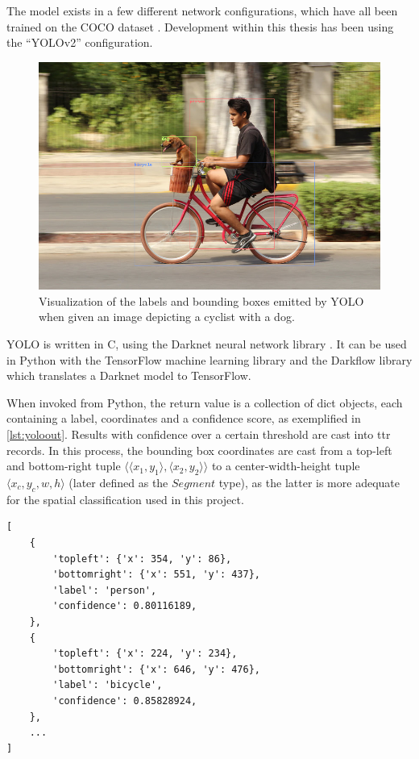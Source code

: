 The model exists in a few different network configurations, which have all been trained on the COCO dataset \citep{LinMicrosoftCOCOCommon2014}.
Development within this thesis has been using the ``YOLOv2'' configuration.

\begin{figure}[h]
\label{fig:dogbike_annotated}
\includegraphics[width=\textwidth]{dogbike_annotated}
\centering
\caption{Visualization of the labels and bounding boxes emitted by YOLO when given an image depicting a cyclist with a dog.}
\end{figure}

YOLO is written in C, using the Darknet neural network library \citep{darknet13}.
It can be used in Python with the TensorFlow machine learning library and the Darkflow library which translates a Darknet model to TensorFlow.

When invoked from Python, the return value is a collection of dict objects, each containing a label, coordinates and a confidence score, as exemplified in \autoref{lst:yoloout}.
Results with confidence over a certain threshold are cast into \gls{ttr} records.
In this process, the bounding box coordinates are cast from a top-left and bottom-right tuple $\langle\langle x_1, y_1\rangle, \langle x_2, y_2\rangle\rangle$ to a center-width-height tuple $\langle x_c, y_c, w, h\rangle$ (later defined as the $Segment$ type), as the latter is more adequate for the spatial classification used in this project.

\begin{lstlisting}[label=lst:yoloout, caption=Example output of YOLO invocation]
[
    {
        'topleft': {'x': 354, 'y': 86},
        'bottomright': {'x': 551, 'y': 437},
        'label': 'person',
        'confidence': 0.80116189,
    },
    {
        'topleft': {'x': 224, 'y': 234},
        'bottomright': {'x': 646, 'y': 476},
        'label': 'bicycle',
        'confidence': 0.85828924,
    },
	...
]
\end{lstlisting}



